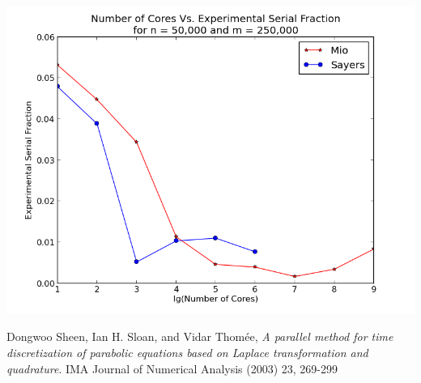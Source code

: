 \documentclass[letterpaper, 12pt]{article}
\begin{document}
	\includegraphics[width=.75\linewidth]{ProjectFiles/results/plots/coresVexpserialfrac.png}
	
	\begin{thebibliography}{1}
			Dongwoo Sheen, Ian H. Sloan, and Vidar Thom\'{e}e,
			\emph{A parallel method for time discretization of parabolic equations based on Laplace transformation and quadrature}.
			IMA Journal of Numerical Analysis (2003) 23,
			269-299
			
	\end{thebibliography}
\end{document}
